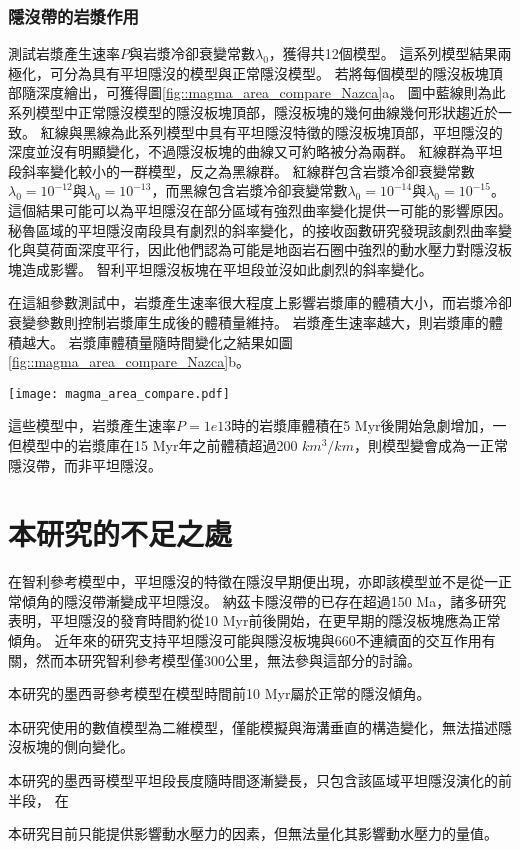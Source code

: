 \subsubsection{隱沒帶的岩漿作用}
測試岩漿產生速率$P$與岩漿冷卻衰變常數$\lambda_0$，獲得共12個模型。
這系列模型結果兩極化，可分為具有平坦隱沒的模型與正常隱沒模型。
若將每個模型的隱沒板塊頂部隨深度繪出，可獲得圖\ref{fig::magma_area_compare_Nazca}a。
圖中藍線則為此系列模型中正常隱沒模型的隱沒板塊頂部，隱沒板塊的幾何曲線幾何形狀趨近於一致。
紅線與黑線為此系列模型中具有平坦隱沒特徵的隱沒板塊頂部，平坦隱沒的深度並沒有明顯變化，不過隱沒板塊的曲線又可約略被分為兩群。
紅線群為平坦段斜率變化較小的一群模型，反之為黑線群。
紅線群包含岩漿冷卻衰變常數$\lambda_0=10^{-12}$與$\lambda_0=10^{-13}$，而黑線包含岩漿冷卻衰變常數$\lambda_0=10^{-14}$與$\lambda_0=10^{-15}$。
這個結果可能可以為平坦隱沒在部分區域有強烈曲率變化提供一可能的影響原因。
秘魯區域的平坦隱沒南段具有劇烈的斜率變化，\citealp{Ma2015}的接收函數研究發現該劇烈曲率變化與莫荷面深度平行，因此他們認為可能是地函岩石圈中強烈的動水壓力對隱沒板塊造成影響。
智利平坦隱沒板塊在平坦段並沒如此劇烈的斜率變化。

在這組參數測試中，岩漿產生速率很大程度上影響岩漿庫的體積大小，而岩漿冷卻衰變參數則控制岩漿庫生成後的體積量維持。
岩漿產生速率越大，則岩漿庫的體積越大。
岩漿庫體積量隨時間變化之結果如圖\ref{fig::magma_area_compare_Nazca}b。

\begin{figure*}[ht]
    \centering
    \texttt{[image: magma\_area\_compare.pdf]}
    \caption[]{}
    \label{fig::magma_area_compare_Nazca}
\end{figure*}

這些模型中，岩漿產生速率$P=1e13$時的岩漿庫體積在5 Myr後開始急劇增加，一但模型中的岩漿庫在15 Myr年之前體積超過200 $km^3/km$，則模型變會成為一正常隱沒帶，而非平坦隱沒。

\section{本研究的不足之處}
在智利參考模型中，平坦隱沒的特徵在隱沒早期便出現，亦即該模型並不是從一正常傾角的隱沒帶漸變成平坦隱沒。
納茲卡隱沒帶的已存在超過150 Ma，諸多研究表明，平坦隱沒的發育時間約從10 Myr前後開始，在更早期的隱沒板塊應為正常傾角。
近年來的研究支持平坦隱沒可能與隱沒板塊與660不連續面的交互作用有關，然而本研究智利參考模型僅300公里，無法參與這部分的討論。

本研究的墨西哥參考模型在模型時間前10 Myr屬於正常的隱沒傾角。

本研究使用的數值模型為二維模型，僅能模擬與海溝垂直的構造變化，無法描述隱沒板塊的側向變化。

本研究的墨西哥模型平坦段長度隨時間逐漸變長，只包含該區域平坦隱沒演化的前半段，
在

本研究目前只能提供影響動水壓力的因素，但無法量化其影響動水壓力的量值。